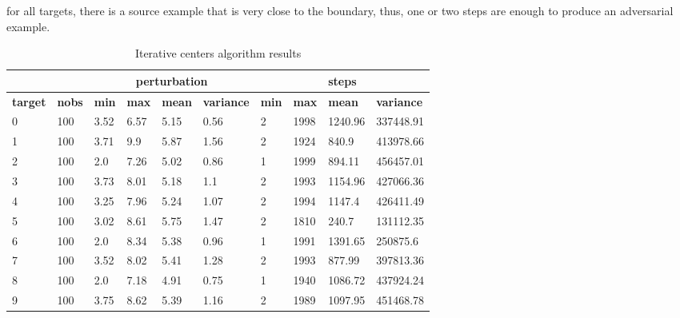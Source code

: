 \documentclass{article}
\begin{document}
for all targets, there is a source example that is very close to the boundary, thus, one or two steps are enough to produce an adversarial example.


\begin{table}[]
\caption{Iterative centers algorithm results}
\label{tab:iterative_result}
\begin{tabular}{|l|l|l|l|l|l|l|l|l|l|}
\hline
\textbf{}       & \textbf{}     & \multicolumn{4}{c|}{\textbf{perturbation}}                      & \multicolumn{4}{c|}{\textbf{steps}}                             \\ \hline
\textbf{target} & \textbf{nobs} & \textbf{min} & \textbf{max} & \textbf{mean} & \textbf{variance} & \textbf{min} & \textbf{max} & \textbf{mean} & \textbf{variance} \\ \hline
0 & 100  & 3.52     & 6.57     & 5.15      & 0.56          & 2         & 1998      & 1240.96    & 337448.91      \\ \hline
1 & 100  & 3.71     & 9.9      & 5.87      & 1.56          & 2         & 1924      & 840.9      & 413978.66      \\ \hline
2 & 100  & 2.0      & 7.26     & 5.02      & 0.86          & 1         & 1999      & 894.11     & 456457.01      \\ \hline
3 & 100  & 3.73     & 8.01     & 5.18      & 1.1           & 2         & 1993      & 1154.96    & 427066.36      \\ \hline
4 & 100  & 3.25     & 7.96     & 5.24      & 1.07          & 2         & 1994      & 1147.4     & 426411.49      \\ \hline
5 & 100  & 3.02     & 8.61     & 5.75      & 1.47          & 2         & 1810      & 240.7      & 131112.35      \\ \hline
6 & 100  & 2.0      & 8.34     & 5.38      & 0.96          & 1         & 1991      & 1391.65    & 250875.6       \\ \hline
7 & 100  & 3.52     & 8.02     & 5.41      & 1.28          & 2         & 1993      & 877.99     & 397813.36      \\ \hline
8 & 100  & 2.0      & 7.18     & 4.91      & 0.75          & 1         & 1940      & 1086.72    & 437924.24      \\ \hline
9 & 100  & 3.75     & 8.62     & 5.39      & 1.16          & 2         & 1989      & 1097.95    & 451468.78      \\ \hline
\end{tabular}
\end{table}
\end{document}
